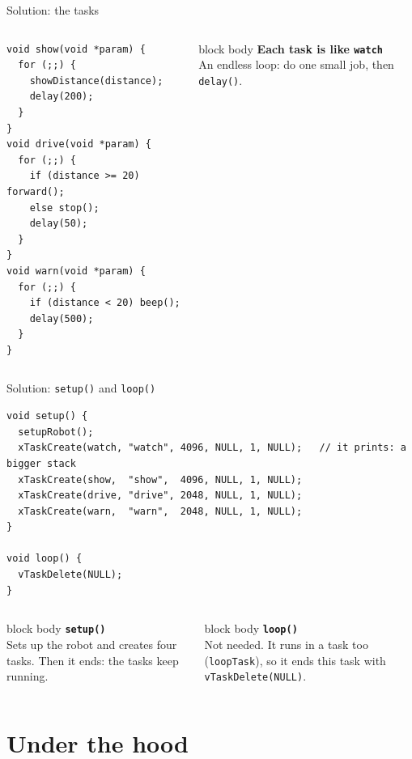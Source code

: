 \documentclass[aspectratio=169,10pt]{beamer}
\newcommand{\stepbox}[2]{%
  \begin{beamercolorbox}[rounded=true,sep=0.09cm,wd=\linewidth]{block body}
    \footnotesize\textbf{#1}\\ #2
  \end{beamercolorbox}\vspace{0.06cm}}
\begin{document}
\begin{frame}[fragile]{Solution: the tasks}
  \begin{columns}[c,onlytextwidth]
\begin{lstlisting}[style=rtos]
void show(void *param) {
  for (;;) {
    showDistance(distance);
    delay(200);
  }
}
void drive(void *param) {
  for (;;) {
    if (distance >= 20) forward();
    else stop();
    delay(50);
  }
}
void warn(void *param) {
  for (;;) {
    if (distance < 20) beep();
    delay(500);
  }
}
\end{lstlisting}
      \stepbox{Each task is like \texttt{watch}}{An endless loop: do one small job, then \texttt{delay()}.}
  \end{columns}
\end{frame}

\begin{frame}[fragile]{Solution: \texttt{setup()} and \texttt{loop()}}
\begin{lstlisting}[style=rtos]
void setup() {
  setupRobot();
  xTaskCreate(watch, "watch", 4096, NULL, 1, NULL);   // it prints: a bigger stack
  xTaskCreate(show,  "show",  4096, NULL, 1, NULL);
  xTaskCreate(drive, "drive", 2048, NULL, 1, NULL);
  xTaskCreate(warn,  "warn",  2048, NULL, 1, NULL);
}

void loop() {
  vTaskDelete(NULL);
}
\end{lstlisting}
  \vfill
  \begin{columns}[T,onlytextwidth]
      \stepbox{\texttt{setup()}}{Sets up the robot and creates four tasks. Then it ends: the tasks keep running.}
      \stepbox{\texttt{loop()}}{Not needed. It runs in a task too (\texttt{loopTask}), so it ends this task with
        \texttt{vTaskDelete(NULL)}.}
  \end{columns}
  \vfill
\end{frame}

\section[Under the hood]{Under the hood}
\end{document}
